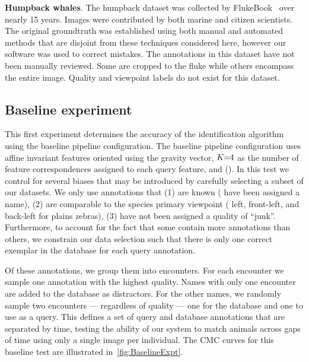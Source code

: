 \begin{itemln}
            \item \textbf{Humpback whales}.
            The humpback dataset was collected by FlukeBook~\cite{levenson_flukebook_2015} over nearly 15 years.
            Images were contributed by both marine and citizen scientists.
            The original groundtruth was established using both manual and automated methods that are disjoint
              from these techniques considered here, however our software was used to correct mistakes.
            The annotations in this dataset have not been manually reviewed.
            Some are cropped to the fluke while others encompass the entire image.
            Quality and viewpoint labels do not exist for this dataset.
        \end{itemln}

    \FloatBarrier{}
    \subsection{Baseline experiment}\label{sub:exptbase}

        This first experiment determines the accuracy of the identification algorithm using the baseline pipeline
          configuration.
        The baseline pipeline configuration uses affine invariant features oriented using the gravity vector,
          $K\mkern-6mu=\mkern-6mu4$ as the number of feature correspondences assigned to each query feature, and \nscoring{}
          (\nsum{}).
        In this test we control for several biases that may be introduced by carefully selecting a subset of our
          datasets.
        We only use annotations that
        (1) are known (\ie{} have been assigned a name),
        (2) are comparable to the species primary viewpoint (\eg{} left, front-left, and back-left for plains
          zebras),
        (3) have not been assigned a quality of ``junk''.
        Furthermore, to account for the fact that some \names{} contain more annotations than others, we
          constrain our data selection such that there is only one correct exemplar in the database for each query
          annotation.

        Of these annotations, we group them into encounters. For each encounter we sample one annotation with the
        highest quality. Names with only one encounter are added to the database as distractors. For the other
        names, we randomly sample two encounters --- regardless of quality --- one for the database and one to use
        as a query. This defines a set of query and database annotations that are separated by time, testing the
        ability of our system to match animals across gaps of time using only a single image per individual. The
        CMC curves for this baseline test are illustrated in~\cref{fig:BaselineExpt}.

